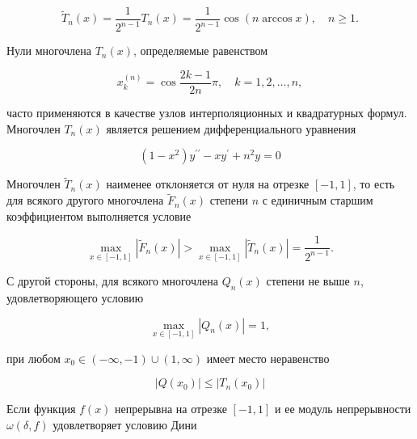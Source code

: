 \documentclass[10pt]{article}
\begin{document}
\[

\tilde{T}_{n}(x)=\frac{1}{2^{n-1}} T_{n}(x)=\frac{1}{2^{n-1}} \cos (n \arccos x), \quad n \geqslant 1 .

\]



Нули многочлена $T_{n}(x)$, определяемые равенством



\[

x_{k}^{(n)}=\cos \frac{2 k-1}{2 n} \pi, \quad k=1,2, \ldots, n,

\]



часто применяются в качестве узлов интерполяционных и квадратурных формул. Многочлен $T_{n}(x)$ является решением дифференциального уравнения



\[

\left(1-x^{2}\right) y^{\prime \prime}-x y^{\prime}+n^{2} y=0

\]



Многочлен $\widetilde{T}_{n}(x)$ наименее отклоняется от нуля на отрезке $[-1,1]$, то есть для всякого другого многочлена $\widetilde{F}_{n}(x)$ степени $n$ с единичным старшим коэффициентом выполняется условие



\[

\max _{x \in[-1,1]}\left|\tilde{F}_{n}(x)\right|>\max _{x \in[-1,1]}\left|\tilde{T}_{n}(x)\right|=\frac{1}{2^{n-1}} .

\]



С другой стороны, для всякого многочлена $Q_{n}(x)$ степени не выше $n$, удовлетворяющего условию



\[

\max _{x \in[-1,1]}\left|Q_{n}(x)\right|=1,

\]



при любом $x_{0} \in(-\infty,-1) \cup(1, \infty)$ имеет место неравенство



\[

\left|Q\left(x_{0}\right)\right| \leqslant\left|T_{n}\left(x_{0}\right)\right|

\]



Если функция $f(x)$ непрерывна на отрезке $[-1,1]$ и ее модуль непрерывности $\omega(\delta, f)$ удовлетворяет условию Дини
\end{document}
